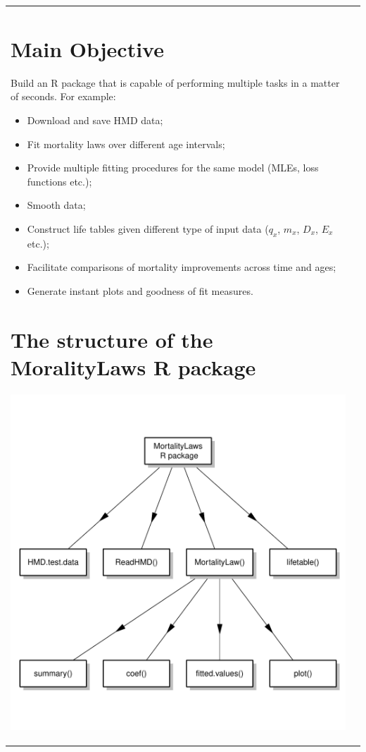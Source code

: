 \documentclass[a0,portrait]{a0poster}\usepackage[]{graphicx}\usepackage[]{color}
\newenvironment{knitrout}{}{} %
\begin{document}
\begin{tabular}{ l  l }
\begin{minipage}[t]{0.45\textwidth}
  \section*{Main Objective}
  \large
   Build an R package that is capable of performing multiple tasks in a matter of seconds. For example:
  \begin{itemize}
  \item Download and save HMD data;
  \item Fit mortality laws over different age intervals;
  \item Provide multiple fitting procedures for the same model (MLEs, loss functions etc.);
  \item Smooth data;
  \item Construct life tables given different type of input data ($q_x$, $m_x$, $D_x$, $E
  _x$ etc.);
  \item Facilitate comparisons of mortality improvements across time and ages;
  \item Generate instant plots and goodness of fit measures.
  \end{itemize}
  
  
  \section*{The structure of the MoralityLaws R package}
\begin{knitrout}
\definecolor{shadecolor}{rgb}{0.969, 0.969, 0.969}\color{fgcolor}

{\centering \includegraphics[width=0.75\linewidth]{figure/Diagram-1} 

}



\end{knitrout}
\end{minipage} %

\end{tabular}
\end{document}
